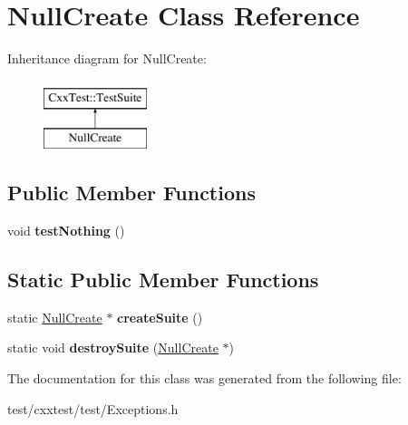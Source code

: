\hypertarget{classNullCreate}{\section{Null\-Create Class Reference}
\label{classNullCreate}
}
Inheritance diagram for Null\-Create\-:\begin{figure}[H]
\begin{center}
\leavevmode
\includegraphics[height=2.000000cm]{classNullCreate}
\end{center}
\end{figure}
\subsection*{Public Member Functions}
\begin{DoxyCompactItemize}
\item 
\hypertarget{classNullCreate_a4795eacafc0b1194e5270820c1e63919}{void {\bfseries test\-Nothing} ()}\label{classNullCreate_a4795eacafc0b1194e5270820c1e63919}

\end{DoxyCompactItemize}
\subsection*{Static Public Member Functions}
\begin{DoxyCompactItemize}
\item 
\hypertarget{classNullCreate_aa0cfda4f002fe308ff2ddda6abbccde4}{static \hyperlink{classNullCreate}{Null\-Create} $\ast$ {\bfseries create\-Suite} ()}\label{classNullCreate_aa0cfda4f002fe308ff2ddda6abbccde4}

\item 
\hypertarget{classNullCreate_a48aae1f90927a09600bf8d34ddf681f6}{static void {\bfseries destroy\-Suite} (\hyperlink{classNullCreate}{Null\-Create} $\ast$)}\label{classNullCreate_a48aae1f90927a09600bf8d34ddf681f6}

\end{DoxyCompactItemize}


The documentation for this class was generated from the following file\-:\begin{DoxyCompactItemize}
\item 
test/cxxtest/test/Exceptions.\-h\end{DoxyCompactItemize}
